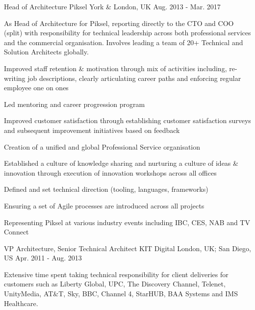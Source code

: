 \begin{cventries}
\cvexpentry
{Head of Architecture} %
{Piksel} %
{York \& London, UK} %
{Aug. 2013 - Mar. 2017} %
{
\begin{cvitemstitle}
\item {As Head of Architecture for Piksel, reporting directly to the CTO and COO (split) with responsibility for technical leadership across both professional services and the commercial organisation. Involves leading a team of 20+ Technical and Solution Architects globally.}
\end{cvitemstitle}
}
{ %
\begin{cvitems}
\item {Improved staff retention \& motivation through mix of activities including, re-writing job descriptions, clearly articulating career paths and enforcing regular employee one on ones}
\item {Led mentoring and career progression program}
\item {Improved customer satisfaction through establishing customer satisfaction surveys and subsequent improvement initiatives based on feedback}
\item {Creation of a unified and global Professional Service organisation}
\item {Established a culture of knowledge sharing and nurturing a culture of ideas \& innovation through execution of innovation workshops across all offices}
\item {Defined and set technical direction (tooling, languages, frameworks)}
\item {Ensuring a set of Agile processes are introduced across all projects}
\item {Representing Piksel at various industry events including IBC, CES, NAB and TV Connect}
\end{cvitems}
}


\cvexpentry
{VP Architecture, Senior Technical Architect} %
{KIT Digital} %
{London, UK; San Diego, US} %
{Apr. 2011 - Aug. 2013} %
{
\begin{cvitemstitle}
\item {Extensive time spent taking technical responsibility for client deliveries for customers such as Liberty Global, UPC, The Discovery Channel, Telenet, UnityMedia, AT\&T, Sky, BBC, Channel 4, StarHUB, BAA Systems and IMS Healthcare.}
\end{cvitemstitle}
}
{ %
\begin{cvitems}
\end{cvitems}
}


\end{cventries}
